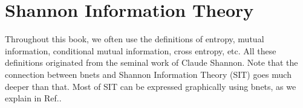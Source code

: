 \chapter{Shannon Information Theory}
\label{ch-shannon-info}

Throughout this book, we often use
the definitions of entropy, mutual information,
conditional mutual information, cross entropy, etc.
All these definitions originated from the seminal work
of Claude Shannon. Note that the
connection between bnets and Shannon Information Theory (SIT)
goes much deeper than that.
Most of SIT can be expressed graphically
using bnets, as we explain in Ref.\cite{tucci-shannon-info}.
